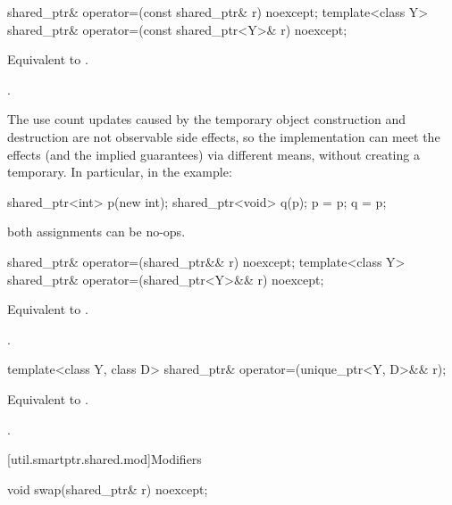 %
\begin{itemdecl}
shared_ptr& operator=(const shared_ptr& r) noexcept;
template<class Y> shared_ptr& operator=(const shared_ptr<Y>& r) noexcept;
\end{itemdecl}

\begin{itemdescr}
\pnum
\effects
Equivalent to .

\pnum
\returns
{}.

\pnum
\begin{note}
The use count updates caused by the temporary object
construction and destruction are not observable side
effects, so the implementation can meet the effects (and the
implied guarantees) via different means, without creating a
temporary. In particular, in the example:
\begin{codeblock}
shared_ptr<int> p(new int);
shared_ptr<void> q(p);
p = p;
q = p;
\end{codeblock}
both assignments can be no-ops.
\end{note}
\end{itemdescr}

%
\begin{itemdecl}
shared_ptr& operator=(shared_ptr&& r) noexcept;
template<class Y> shared_ptr& operator=(shared_ptr<Y>&& r) noexcept;
\end{itemdecl}

\begin{itemdescr}
\pnum
\effects
Equivalent to .

\pnum
\returns
{}.
\end{itemdescr}

%
\begin{itemdecl}
template<class Y, class D> shared_ptr& operator=(unique_ptr<Y, D>&& r);
\end{itemdecl}

\begin{itemdescr}
\pnum
\effects
Equivalent to .

\pnum
\returns
{}.
\end{itemdescr}

[util.smartptr.shared.mod]{Modifiers}

%
\begin{itemdecl}
void swap(shared_ptr& r) noexcept;
\end{itemdecl}

